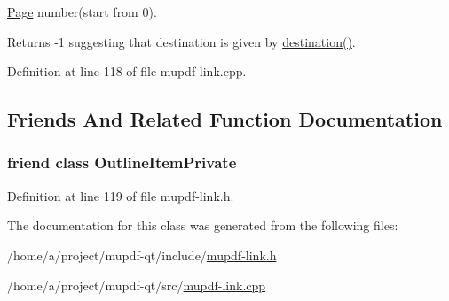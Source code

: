 \hyperlink{class_mu_p_d_f_1_1_page}{Page} number(start from 0). 

\begin{DoxyReturn}{Returns}
-\/1 suggesting that destination is given by \hyperlink{class_mu_p_d_f_1_1_link_goto_r_ab5ff953c35930b5ff57740decee8c61b}{destination()}. 
\end{DoxyReturn}


Definition at line 118 of file mupdf-\/link.\-cpp.



\subsection{Friends And Related Function Documentation}
\hypertarget{class_mu_p_d_f_1_1_link_goto_r_ab008ed670017e41b6e6bba8707c775d2}{
\subsubsection[{Outline\-Item\-Private}]{\setlength{\rightskip}{0pt plus 5cm}friend class Outline\-Item\-Private\hspace{0.3cm}{\ttfamily [friend]}}}\label{class_mu_p_d_f_1_1_link_goto_r_ab008ed670017e41b6e6bba8707c775d2}


Definition at line 119 of file mupdf-\/link.\-h.



The documentation for this class was generated from the following files\-:\begin{DoxyCompactItemize}
\item 
/home/a/project/mupdf-\/qt/include/\hyperlink{mupdf-link_8h}{mupdf-\/link.\-h}\item 
/home/a/project/mupdf-\/qt/src/\hyperlink{mupdf-link_8cpp}{mupdf-\/link.\-cpp}\end{DoxyCompactItemize}
